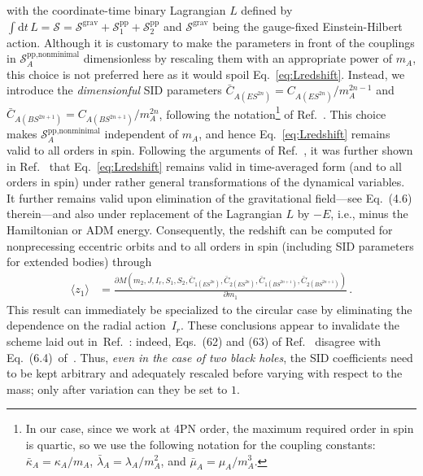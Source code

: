 \documentclass[prd,superscriptaddress,preprintnumbers,tightenlines,nofootinbib, eqsecnum]{revtex4-2}
\renewcommand{\dd}{\mathrm{d}}
\begin{document}
with the coordinate-time binary Lagrangian $L$ defined by $\int \dd t \, L = \mathcal{S} = \mathcal{S}^\text{grav} + \mathcal{S}^\text{pp}_1 + \mathcal{S}^\text{pp}_2$ and $\mathcal{S}^\text{grav}$ being the gauge-fixed Einstein-Hilbert action. Although it is customary to make the parameters in front of the couplings in $\mathcal{S}^\text{pp,nonminimal}_A$ dimensionless by rescaling them with an appropriate power of $m_A$, this choice is not preferred here as it would spoil Eq.~\eqref{eq:Lredshift}. Instead, we introduce the \textit{dimensionful} SID parameters $\bar{C}_{A(ES^{2n})}={C}_{A(ES^{2n})}/m_A^{2n-1}$ and $\bar{C}_{A(BS^{2n+1})}={C}_{A(BS^{2n+1})}/m_A^{2n}$, following the notation\footnote{In our case, since we work at 4PN order, the maximum required order in spin is quartic, so we use the following notation for the coupling constants: $\bar{\kappa}_A = \kappa_A/m_A$, $\bar{\lambda}_A = \lambda_A/m_A^2$, and $\bar{\mu}_A = \mu_A/m_A^3$.} of Ref.~\cite{Levi:2015msa}. This choice makes $\mathcal{S}^\text{pp,nonminimal}_A$ independent of $m_A$, and hence Eq.~\eqref{eq:Lredshift} remains valid to all orders in spin. Following the arguments of Ref.~\cite{Blanchet:2012at}, it was further shown in Ref.~\cite{Antonelli:2020ybz} that Eq.~\eqref{eq:Lredshift} remains valid in time-averaged form (and to all orders in spin) under rather general transformations of the dynamical variables. It further remains valid upon elimination of the gravitational field---see Eq.~(4.6) therein---and also under replacement of the Lagrangian $L$ by $-E$, i.e., minus the Hamiltonian or ADM energy. Consequently, the redshift can be computed for nonprecessing eccentric orbits and to all orders in spin (including SID parameters for extended bodies)  through 
%
 \begin{align}
    \langle z_1 \rangle &= \frac{\partial M(m_2,J,I_r, S_1,S_2,\bar{C}_{1(ES^{2n})},\bar{C}_{2(ES^{2n})},\bar{C}_{1(BS^{2n+1})},\bar{C}_{2(BS^{2n+1})})}{\partial m_1} \,.
\end{align}
This result can immediately be specialized to the circular case by eliminating the dependence on the radial action~$I_r$. 
%
These conclusions appear to invalidate the scheme laid out in~Ref.~\cite{Bini:2019lcd}: indeed, Eqs.~(62) and (63) of Ref.~\cite{Bini:2019lcd} disagree with Eq.~(6.4)~of~\cite{Bini:2020zqy}. Thus, \textit{even in the case of two black holes}, the SID coefficients need to be kept arbitrary and adequately rescaled before varying with respect to the mass; only after variation can they be set to $1$. 
\end{document}
